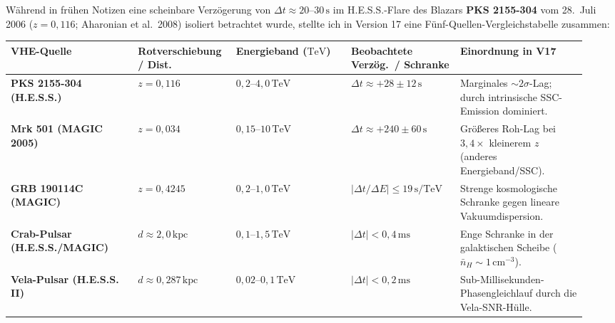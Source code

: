 \documentclass[10pt,a4paper]{article}
\begin{document}
\par
W\"ahrend in fr\"uhen Notizen eine scheinbare Verz\"ogerung von $\Delta t \approx 20\text{--}30\,\text{s}$ im H.E.S.S.-Flare des Blazars \textbf{PKS 2155-304} vom 28.\ Juli 2006 ($z = 0{,}116$; Aharonian et al.\ 2008) isoliert betrachtet wurde, stellte ich in Version 17 eine F\"unf-Quellen-Vergleichstabelle zusammen:

\begin{center}\vspace{-2pt}
{\footnotesize
\begin{tabular}{@{}>{\bfseries}p{0.21\linewidth}p{0.15\linewidth}p{0.19\linewidth}p{0.18\linewidth}p{0.21\linewidth}@{}}
\toprule
VHE-Quelle & Rotverschiebung / Dist. & Energieband ($\text{TeV}$) & Beobachtete Verz\"og.\ / Schranke & Einordnung in V17 \\
\midrule
PKS 2155-304 (H.E.S.S.) & $z = 0{,}116$ & $0{,}2\text{--}4{,}0\,\text{TeV}$ & $\Delta t \approx +28 \pm 12\,\text{s}$ & Marginales $\sim 2\sigma$-Lag; durch intrinsische SSC-Emission dominiert. \\
Mrk 501 (MAGIC 2005) & $z = 0{,}034$ & $0{,}15\text{--}10\,\text{TeV}$ & $\Delta t \approx +240 \pm 60\,\text{s}$ & Gr\"o\ss eres Roh-Lag bei $3{,}4\times$ kleinerem $z$ (anderes Energieband/SSC). \\
GRB 190114C (MAGIC) & $z = 0{,}4245$ & $0{,}2\text{--}1{,}0\,\text{TeV}$ & $|\Delta t / \Delta E| \le 19\,\text{s/TeV}$ & Strenge kosmologische Schranke gegen lineare Vakuumdispersion. \\
Crab-Pulsar (H.E.S.S./MAGIC) & $d \approx 2{,}0\,\text{kpc}$ & $0{,}1\text{--}1{,}5\,\text{TeV}$ & $|\Delta t| < 0{,}4\,\text{ms}$ & Enge Schranke in der galaktischen Scheibe ($\bar{n}_H \sim 1\,\text{cm}^{-3}$). \\
Vela-Pulsar (H.E.S.S. II) & $d \approx 0{,}287\,\text{kpc}$ & $0{,}02\text{--}0{,}1\,\text{TeV}$ & $|\Delta t| < 0{,}2\,\text{ms}$ & Sub-Millisekunden-Phasengleichlauf durch die Vela-SNR-H\"ulle. \\
\bottomrule
\end{tabular}}
\end{center}
\end{document}
